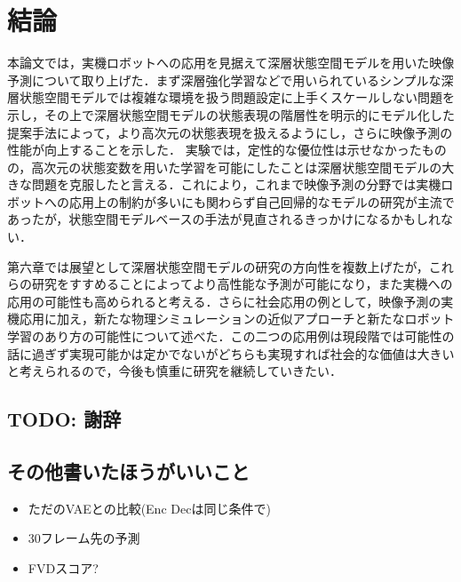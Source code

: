 \chapter{結論}
\label{chap:conclusion}

本論文では，実機ロボットへの応用を見据えて深層状態空間モデルを用いた映像予測について取り上げた．まず深層強化学習などで用いられているシンプルな深層状態空間モデルでは複雑な環境を扱う問題設定に上手くスケールしない問題を示し，その上で深層状態空間モデルの状態表現の階層性を明示的にモデル化した提案手法によって，より高次元の状態表現を扱えるようにし，さらに映像予測の性能が向上することを示した．
実験では，定性的な優位性は示せなかったものの，高次元の状態変数を用いた学習を可能にしたことは深層状態空間モデルの大きな問題を克服したと言える．これにより，これまで映像予測の分野では実機ロボットへの応用上の制約が多いにも関わらず自己回帰的なモデルの研究が主流であったが，状態空間モデルベースの手法が見直されるきっかけになるかもしれない．

第六章では展望として深層状態空間モデルの研究の方向性を複数上げたが，これらの研究をすすめることによってより高性能な予測が可能になり，また実機への応用の可能性も高められると考える．さらに社会応用の例として，映像予測の実機応用に加え，新たな物理シミュレーションの近似アプローチと新たなロボット学習のあり方の可能性について述べた．この二つの応用例は現段階では可能性の話に過ぎず実現可能かは定かでないがどちらも実現すれば社会的な価値は大きいと考えられるので，今後も慎重に研究を継続していきたい．

\newpage
\section{TODO: 謝辞}

\section{その他書いたほうがいいこと}
\begin{itemize}
    \item ただのVAEとの比較(Enc Decは同じ条件で)
    \item 30フレーム先の予測
    \item FVDスコア?
\end{itemize}
